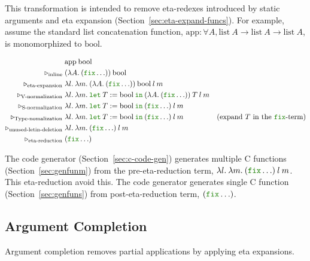 \documentclass[a4paper,fleqn]{article}
\newcommand{\kwlet}{\mbox{\color{mygreen}\ttfamily let}}
\newcommand{\kwin}{\mbox{\color{mygreen}\ttfamily in}}
\newcommand{\kwfix}{\mbox{\color{mygreen}\ttfamily fix}}
\newcommand{\lam}[2]{\lambda #1.\:#2}
\newcommand{\letin}[3]{\kwlet\:#1:=#2\:\kwin\:#3}
\newcommand{\secref}[1]{Section~\ref{#1}}
\newcommand{\reltri}{\mathrel{\triangleright}}
\begin{document}
This transformation is intended to remove eta-redexes introduced by static arguments and eta expansion (\secref{sec:eta-expand-funcs}).
For example, assume the standard list concatenation function,
$\textrm{app}: \forall A, \textrm{list}\:A \rightarrow \textrm{list}\:A \rightarrow \textrm{list}\:A$,
is monomorphized to $\textrm{bool}$.

\begin{align*}
  & \textrm{app}\:\textrm{bool} \\
  \reltri_\textrm{inline}\; & (\lam{A}{(\kwfix \ldots)})\:\textrm{bool} \\
  \reltri_\textrm{eta-expansion}\; & \lam{l}{\lam{m}{(\lam{A}{(\kwfix \ldots)})\:\textrm{bool}\:l\:m}} \\
  \reltri_\textrm{V-normalization}\; & \lam{l}{\lam{m}{\letin{T}{\textrm{bool}}{(\lam{A}{(\kwfix \ldots)})\:T\:l\:m}}} \\
  \reltri_\textrm{S-normalization}\; & \lam{l}{\lam{m}{\letin{T}{\textrm{bool}}{(\kwfix \ldots)\:l\:m}}} \\
  \reltri_\textrm{Type-nomalization}\; & \lam{l}{\lam{m}{\letin{T}{\textrm{bool}}{(\kwfix \ldots)\:l\:m}}} & \textrm{(expand $T$ in the \kwfix-term)} \\
  \reltri_\textrm{unused-letin-deletion}\; & \lam{l}{\lam{m}{(\kwfix \ldots)\:l\:m}} \\
  \reltri_\textrm{eta-reduction}\; & (\kwfix \ldots) \\
\end{align*}

The code generator (\secref{sec:c-code-gen}) generates multiple C functions (\secref{sec:genfunm}) from the pre-eta-reduction term, $\lam{l}{\lam{m}{(\kwfix \ldots)\:l\:m}}$.
This eta-reduction avoid this.
The code generator generates single C function (\secref{sec:genfuns}) from post-eta-reduction term, $(\kwfix \ldots)$.

\subsection{Argument Completion}\label{sec:argcomp}
Argument completion removes partial applications by applying eta expansions.
\end{document}
